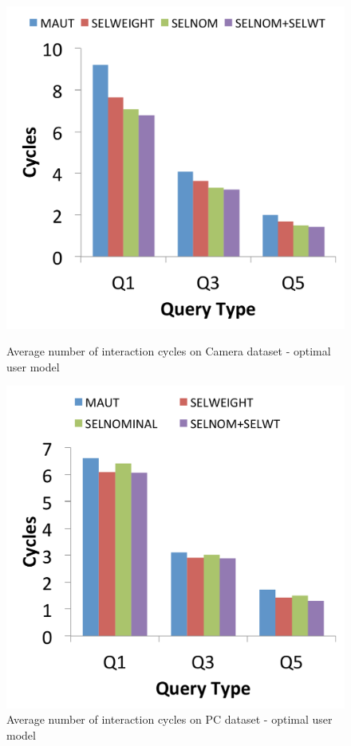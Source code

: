 \begin{figure}[h]
\centering
\begin{minipage}{.45\textwidth}
  \centering
  \includegraphics[width=1\linewidth]{figures-bharath/sel_camera_opt}
  \caption[]{Average number of interaction cycles on Camera dataset - optimal user model}
  \label{fig:sel_camera_opt}
\end{minipage}%
\;\;\;\;\;\;
\begin{minipage}{.45\textwidth}
  \centering
  \includegraphics[width=1\linewidth]{figures-bharath/sel_pc_opt}
  \caption[]{Average number of interaction cycles on PC dataset - optimal user model}
  \label{fig:sel_pc_opt}
\end{minipage}
\end{figure}

